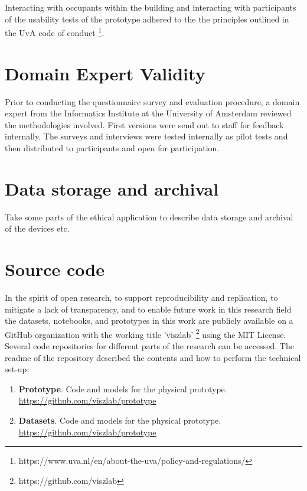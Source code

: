 \begin{appendices}
Interacting with occupants within the building and interacting with participants of the usability tests of the prototype adhered to the the principles outlined in the UvA code of conduct \footnote{https://www.uva.nl/en/about-the-uva/policy-and-regulations/}.

\section{Domain Expert Validity}
\label{appendix:experts}

Prior to conducting the questionnaire survey and evaluation procedure, a domain expert from the Informatics Institute at the University of Amsterdam reviewed the methodologies involved. First versions were send out to staff for feedback internally. The surveys and interviews were tested internally as pilot tests and then distributed to participants and open for participation. 

\section{Data storage and archival}
\label{appendix:data}

Take some parts of the ethical application to describe data storage and archival of the devices etc.

\section{Source code}
\label{appendix:source}

In the spirit of open research, to support reproducibility and replication, to mitigate a lack of transparency, and to enable future work in this research field the datasets, notebooks, and prototypes in this work are publicly available on a GitHub organization with the working title 'viszlab' \footnote{https://github.com/viszlab} using the MIT License. Several code repositories for different parts of the research can be accessed. The readme of the repository described the contents and how to perform the technical set-up:

\begin{enumerate}
  \item \textbf{Prototype}. Code and models for the physical prototype.\\
  \underline{https://github.com/viszlab/prototype}
  \item \textbf{Datasets}. Code and models for the physical prototype.\\
  \underline{https://github.com/viszlab/prototype}
\end{enumerate}


\end{appendices}
